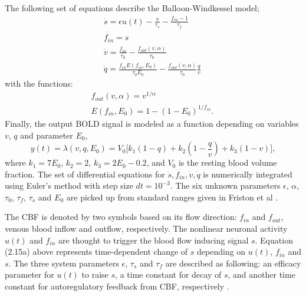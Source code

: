 The following set of equations describe the Balloon-Windkessel model;
\begin{subequations}
 \begin{align} \dot{s} = \epsilon u(t)- \frac{s}{\tau_s} - \frac{f_{in} -1 }{\tau_f}  \label{eqn: frobenius 19}\\  \dot{f_{in}} = s
\label{eqn: frobenius 20} \\ \dot{v} = \frac{f_{in}}{\tau_0} - \frac{f_{out}(v, \alpha)}{\tau_0} 
\label{eqn: frobenius 21} \\ \dot{q} = \frac{f_{in} E(f_{in}, E_0)}{\tau_0 E_0}- \frac{f_{out}(v, \alpha)}{\tau_0}  \frac{q}{v}  
\
\end{align} 
\end{subequations}
with the functions:
\begin{subequations}
 \begin{align} f_{out}(v, \alpha) = v^{1/ \alpha}
 \label{eqn: frobenius 22}\\  E(f_{in} , E_0) = 1- (1-E_0)^{1/f_{in}} . \
\end{align} 
\end{subequations}
Finally, the output BOLD signal is modeled as a function depending on variables $v$, $q$ and parameter $E_0$,  
\begin{equation}
y(t)= \lambda (v,q,E_0) = V_0 \Big[ k_1(1-q) + k_2 \left( 1- \frac{q}{v} \right) + k_3(1-v)  \Big],
\end{equation} 
where $k_1 = 7E_0$, $k_2 = 2$, $k_3 = 2E_0 - 0.2$, and $V_0$ is the resting blood volume fraction. The set of differential equations for ${\dot{s}, \dot{f_{in}}, \dot{v}, \dot{q}}$ is numerically integrated using Euler's method with step size $dt=10^{-3}$. The six unknown parameters $\epsilon$, $\alpha$, $\tau_0$, $\tau_f$, $\tau_s$ and $E_0$ are picked up from standard ranges given in Friston et al  \citep{FRI00}. 

The CBF is denoted by two symbols based on its flow direction: $f_{in}$ and $f_{out}$, venous blood inflow and outflow, respectively. The nonlinear neuronal activity $u(t)$ and $f_{in}$ are thought to trigger the blood flow inducing signal $s$. Equation (2.15a) above represents time-dependent change of  $s$ depending on $u(t)$, $f_{in}$ and $s$. The three system parameters $\epsilon$, $\tau_s$ and $\tau_f$ are described as following: an efficacy parameter for $u(t)$ to raise $s$, a time constant for decay of $s$, and another time constant for autoregulatory feedback from CBF, respectively \citep{XYZ1994, XYZ1998}.

